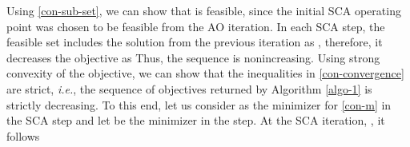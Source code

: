 \iftoggle{single_column}{
\begin{equation}\label{con-sub-set}\allowdisplaybreaks
h(\iter{\mz}{k+1}{i}) - {g}_0(\iter{\mx}{k+1}{i},\iter{\my}{\lpoint}{i-1}) \leq h(\iter{\mz}{k+1}{i}) - \hat{g}_0(\iter{\mx}{k+1}{i},\iter{\my}{\lpoint}{i-1};\iter{\mx}{k}{i}) \leq 0. 
\end{equation}}{
\begin{multline}\label{con-sub-set}\allowdisplaybreaks
h(\iter{\mz}{k+1}{i}) - {g}_0(\iter{\mx}{k+1}{i},\iter{\my}{\lpoint}{i-1}) \leq \\
h(\iter{\mz}{k+1}{i}) - \hat{g}_0(\iter{\mx}{k+1}{i},\iter{\my}{\lpoint}{i-1};\iter{\mx}{k}{i}) \leq 0. 
\end{multline}}
Using \eqref{con-sub-set}, we can show that  is feasible, since the initial \ac{SCA} operating point  was chosen to be feasible from the  \ac{AO} iteration. In each \ac{SCA} step, the feasible set includes the solution from the previous iteration as , therefore, it decreases the objective as \cite{lanckriet2009convergence,scutari_1,amir}
\iftoggle{single_column}{
\begin{equation} \label{con-convergence}
f(\iter{\mx}{0}{i},\iter{\my}{\lpoint}{i-1},\iter{\mz}{0}{i}) \geq f(\iter{\mx}{k}{i},\iter{\my}{\lpoint}{i-1},\iter{\mz}{k}{i}) \geq f(\iter{\mx}{k+1}{i},\iter{\my}{\lpoint}{i-1},\iter{\mz}{k+1}{i}) \geq f(\iter{\mx}{\lpoint}{i},\iter{\my}{\lpoint}{i-1},\iter{\mz}{\lpoint|\my}{i}). 
\end{equation}}{
\begin{multline} \label{con-convergence} \allowdisplaybreaks
f(\iter{\mx}{0}{i},\iter{\my}{\lpoint}{i-1},\iter{\mz}{0}{i}) \geq f(\iter{\mx}{k}{i},\iter{\my}{\lpoint}{i-1},\iter{\mz}{k}{i}) \\ \geq f(\iter{\mx}{k+1}{i},\iter{\my}{\lpoint}{i-1},\iter{\mz}{k+1}{i}) \geq f(\iter{\mx}{\lpoint}{i},\iter{\my}{\lpoint}{i-1},\iter{\mz}{\lpoint|\my}{i}). 
\end{multline}}
Thus, the sequence  is nonincreasing. Using strong convexity of the objective, we can show that the inequalities in \eqref{con-convergence} are strict, \textit{i.e.}, the sequence of objectives returned by Algorithm \ref{algo-1} is strictly decreasing. To this end, let us consider  as the minimizer for \eqref{con-m} in the  \ac{SCA} step and let  be the minimizer in the  step. At the  \ac{SCA} iteration, , it follows
